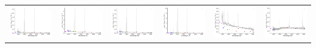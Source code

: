 \begin{center}
\begin{longtable}{l l l l l l }
    \includegraphics[width=0.3\linewidth, clip]{Figs/Figs-sdss/spec-0330-52370-0072-SPLUS-n03s22-026437.pdf} & \includegraphics[width=0.3\linewidth, clip]{Figs/Figs-sdss/spec-0330-52370-0131-SPLUS-n03s21-001338.pdf} & \includegraphics[width=0.3\linewidth, clip]{Figs/Figs-sdss/spec-0330-52370-0144-SPLUS-n03s21-009182.pdf} & \includegraphics[width=0.3\linewidth, clip]{Figs/Figs-sdss/spec-0376-52143-0160-STRIPE82-0139-046699.pdf} & \includegraphics[width=0.3\linewidth, clip]{Figs/Figs-sdss/spec-0376-52143-0631-STRIPE82-0142-027354.pdf} & \includegraphics[width=0.3\linewidth, clip]{Figs/Figs-sdss/spec-0377-52145-0294-STRIPE82-0141-019376.pdf} \\

\end{longtable}
\end{center}
